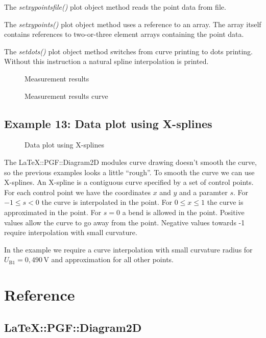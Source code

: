 \documentclass[origlongtable]{scrartcl}
\newcommand{\includepgfimage}[2]{%
\begin{figure}%
{\centering%
\caption{#2}\label{fig:#1}%
}%
\end{figure}%
}
\begin{document}
The
\textit{set\textunderscore{}xy\textunderscore{}points\textunderscore{}file()\/}
plot object method reads the point data from file.

The
\textit{set\textunderscore{}xy\textunderscore{}points()\/} plot object method
uses a reference to an array. The array itself contains references to
two-or-three element arrays containing the point data.

The
\textit{set\textunderscore{}dots()\/} plot object method switches from
curve printing to dots printing. Without this instruction a natural
spline interpolation is printed.

\clearpage
\includepgfimage{../examples/test013a}{Measurement results}
\clearpage

\clearpage
\includepgfimage{../examples/test014a}{Measurement results curve}
\clearpage

\clearpage
\subsection[X-splines]{Example 13: Data plot using X-splines}
\includepgfimage{../examples/test015a}{Data plot using X-splines}
The LaTeX::PGF::Diagram2D modules curve drawing doesn't smooth the
curve, so the previous examples looks a little ``rough''.
To smooth the curve we can use X-splines. An X-spline is a contiguous
curve specified by a set of control points. For each control point
we have the coordinates \(x\) and \(y\) and a paramter \(s\).
For \(-1\leq{}s<0\) the curve is interpolated in the point.
For \(0\leq{}x\leq{}1\) the curve is approximated in the point.
For \(s=0\) a bend is allowed in the point. Positive values allow
the curve to go away from the point. Negative values towards
-1 require interpolation with small curvature.

In the example we require a curve interpolation with small
curvature radius for \(U_{\text{B1}}=0,490\,\text{V}\) and
approximation for all other points.

\clearpage

\clearpage
\section{Reference}
\subsection[Diagram]{LaTeX::PGF::Diagram2D}
\end{document}
